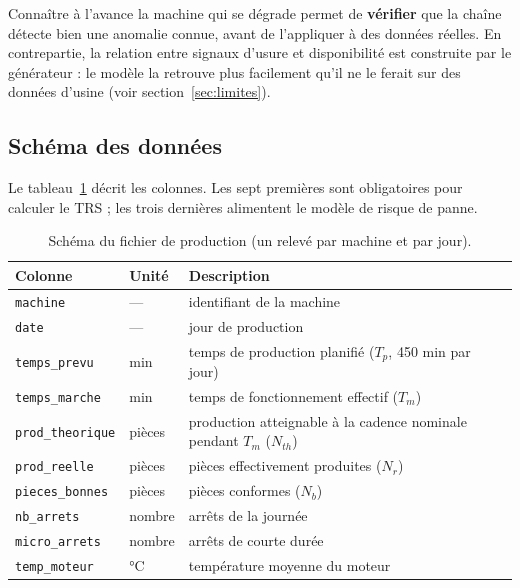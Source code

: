 \documentclass[11pt,a4paper]{article}
\newcommand{\code}[1]{\texttt{#1}}
\begin{document}
\begin{encadre}
Connaître à l'avance la machine qui se dégrade permet de \textbf{vérifier} que la chaîne détecte
bien une anomalie connue, avant de l'appliquer à des données réelles. En contrepartie, la relation
entre signaux d'usure et disponibilité est construite par le générateur : le modèle la retrouve
plus facilement qu'il ne le ferait sur des données d'usine (voir section~\ref{sec:limites}).
\end{encadre}

\subsection{Schéma des données}
Le tableau~\ref{tab:schema} décrit les colonnes. Les sept premières sont obligatoires pour calculer
le TRS ; les trois dernières alimentent le modèle de risque de panne.

\begin{table}[ht]
\centering\small
\caption{Schéma du fichier de production (un relevé par machine et par jour).}
\label{tab:schema}
\begin{tabularx}{\textwidth}{@{}l l X@{}}
\toprule
\textbf{Colonne} & \textbf{Unité} & \textbf{Description} \\
\midrule
\code{machine}        & —        & identifiant de la machine \\
\code{date}           & —        & jour de production \\
\code{temps\_prevu}   & min      & temps de production planifié ($T_p$, 450 min par jour) \\
\code{temps\_marche}  & min      & temps de fonctionnement effectif ($T_m$) \\
\code{prod\_theorique}& pièces   & production atteignable à la cadence nominale pendant $T_m$ ($N_{th}$) \\
\code{prod\_reelle}   & pièces   & pièces effectivement produites ($N_r$) \\
\code{pieces\_bonnes} & pièces   & pièces conformes ($N_b$) \\
\midrule
\code{nb\_arrets}     & nombre   & arrêts de la journée \\
\code{micro\_arrets}  & nombre   & arrêts de courte durée \\
\code{temp\_moteur}   & °C       & température moyenne du moteur \\
\bottomrule
\end{tabularx}
\end{table}
\end{document}
